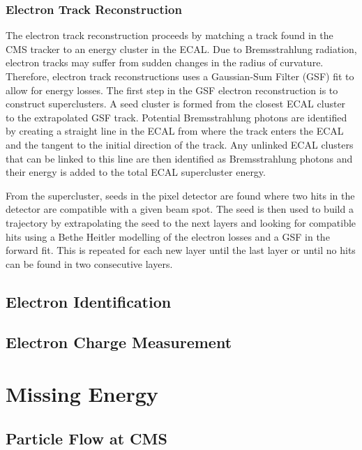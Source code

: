 \subsubsection{Electron Track Reconstruction}
The electron track reconstruction proceeds by matching a track found in the CMS
tracker to an energy cluster in the ECAL.
Due to Bremsstrahlung radiation, electron tracks may suffer from sudden changes
in the radius of curvature. 
Therefore, electron track reconstructions uses a Gaussian-Sum Filter (GSF) fit
to allow for energy losses. 
The first step in the GSF electron reconstruction is to construct
superclusters.
A seed cluster is formed from the closest ECAL cluster to the extrapolated GSF
track. 
Potential Bremsstrahlung photons are identified by creating a straight line in
the ECAL from where the track enters the ECAL and the tangent to the initial
direction of the track. 
Any unlinked ECAL clusters that can be linked to this line are then identified
as Bremsstrahlung photons and their energy is added to the total ECAL
supercluster energy.\cite{eleReco}

From the supercluster, seeds in the pixel detector are found where two hits in
the detector are compatible with a given beam spot. The seed is then used to
build a trajectory by extrapolating the seed to the next layers and looking for
compatible hits using a Bethe Heitler modelling of the electron losses and a
GSF in the forward fit. This is repeated for each new layer until the last
layer or until no hits can be found in two consecutive layers.\cite{eleReco}

\subsection{Electron Identification}

\subsection{Electron Charge Measurement}

\section{Missing Energy}

\subsection{Particle Flow at CMS}

